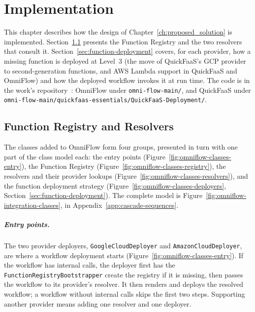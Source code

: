 %
%
%
\chapter{Implementation}
\label{cha:impl}

This chapter describes how the design of Chapter~\ref{ch:proposed_solution} is implemented.
Section~\ref{sec:function-registry} presents the Function Registry and the two resolvers that
consult it. Section~\ref{sec:function-deployment} covers, for each provider, how a missing function is
deployed at Level~3 (the move of QuickFaaS's GCP provider to second-generation functions, and AWS
Lambda support in QuickFaaS and OmniFlow) and how the deployed workflow invokes it at run time.
The code is in the work's repository~\cite{carvalho2026repository}: OmniFlow under
\texttt{omni-flow-main/}, and QuickFaaS under
\texttt{omni-flow-main/\allowbreak quickfaas-essentials/\allowbreak QuickFaaS-Deployment/}.

\section{Function Registry and Resolvers}
\label{sec:function-registry}

The classes added to OmniFlow form four groups, presented in turn with one part of the class
model each: the entry points (Figure~\ref{fig:omniflow-classes-entry}), the Function Registry
(Figure~\ref{fig:omniflow-classes-registry}), the resolvers and their provider lookups
(Figure~\ref{fig:omniflow-classes-resolvers}), and the function deployment strategy
(Figure~\ref{fig:omniflow-classes-deployers}, Section~\ref{sec:function-deployment}). The complete
model is Figure~\ref{fig:omniflow-integration-classes}, in Appendix~\ref{app:cascade-sequences}.

\paragraph{Entry points.} The two provider deployers,
\texttt{Google\allowbreak Cloud\allowbreak Deployer} and
\texttt{Amazon\allowbreak Cloud\allowbreak Deployer}, are where a workflow deployment starts
(Figure~\ref{fig:omniflow-classes-entry}). If the workflow has internal calls, the deployer first
has the \texttt{Function\allowbreak Registry\allowbreak Bootstrapper} create the registry if it is
missing, then passes the workflow to its provider's resolver. It then renders and deploys the
resolved workflow; a workflow without internal calls skips the first two steps. Supporting another provider means adding
one resolver and one deployer.

